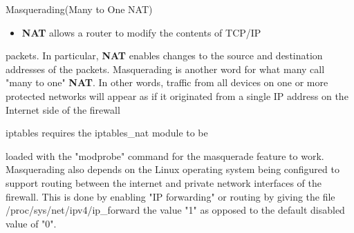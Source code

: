 \begin{frame}[t,allowframebreaks]{Masquerading(Many to One NAT)}
  \fontsize{15}{18}\selectfont
  \begin{itemize}
    \item \textcolor{CommandGreen}{\bfseries NAT} allows a router to modify the contents of TCP/IP
  \end{itemize}
  packets. In particular, \textcolor{CommandGreen}{\bfseries NAT} enables changes to the source and destination addresses of the packets. Masquerading is another word for what many call "many to one" \textcolor{CommandGreen}{\bfseries NAT}. In other words, traffic from all devices on one or more protected networks will appear as if it originated from a single IP address on the Internet side of the firewall\par
  \vspace{0.08cm}
  {\color{CommandGreen}\ttfamily\fontsize{13.5}{16.5}\selectfont iptables requires the iptables\_nat module to be\par}
  loaded with the "modprobe" command for the masquerade feature to work. Masquerading also depends on the Linux operating system being configured to support routing between the internet and private network interfaces of the firewall. This is done by enabling "IP forwarding" or routing by giving the file /proc/sys/net/ipv4/ip\_forward the value "1" as opposed to the default disabled value of "0".\par
\end{frame}
